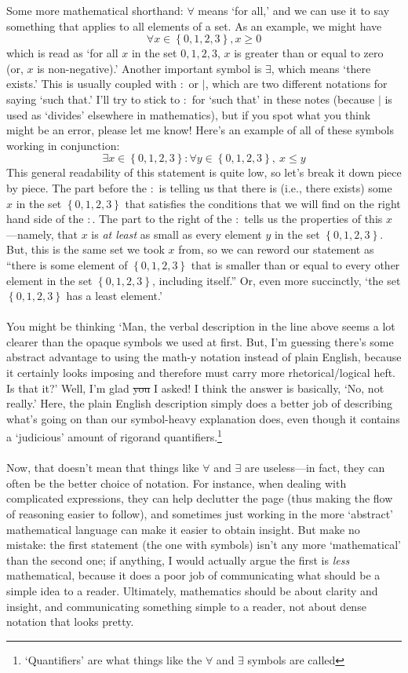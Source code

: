 \documentclass[10pt]{article}
\theoremstyle{definition}
\newcommand{\set}[1]{\left\{ #1 \right\}}
\begin{document}
Some more mathematical shorthand: $\forall$ means `for all,' and we can use it to say something that applies to all elements of a set.  As an example, we might have
\[\forall x\in \set{0,1,2,3}, x\geq 0\]
which is read as `for all $x$ in the set ${0,1,2,3}$, $x$ is greater than or equal to zero (or, $x$ is non-negative).'  Another important symbol is $\exists$, which means `there exists.'  This is usually coupled with $:$ or $|$, which are two different notations for saying `such that.'  I'll try to stick to $:$ for `such that' in these notes (because $|$ is used as `divides' elsewhere in mathematics), but if you spot what you think might be an error, please let me know!  Here's an example of all of these symbols working in conjunction:
\[\exists x\in \set{0,1,2,3} : \forall y\in\set{0,1,2,3},~x\leq y\]
This general readability of this statement is quite low, so let's break it down piece by piece.  The part before the $:$ is telling us that there is (i.e., there exists) some $x$ in the set $\set{0,1,2,3}$ that satisfies the conditions that we will find on the right hand side of the $:$.  The part to the right of the $:$ tells us the properties of this $x$---namely, that $x$ is \emph{at least} as small as every element $y$ in the set $\set{0,1,2,3}$.  But, this is the same set we took $x$ from, so we can reword our statement as ``there is some element of $\set{0,1,2,3}$ that is smaller than or equal to every other element in the set $\set{0,1,2,3}$, including itself.''  Or, even more succinctly, `the set $\set{0,1,2,3}$ has a least element.'  \\~\\
You might be thinking `Man, the verbal description in the line above seems a lot clearer than the opaque symbols we used at first.  But, I'm guessing there's some abstract advantage to using the math-y notation instead of plain English, because it certainly looks imposing and therefore must carry more rhetorical/logical heft.  Is that it?'  Well, I'm glad \sout{you} I asked!  I think the answer is basically, `No, not really.'  Here, the plain English description simply does a better job of describing what's going on than our symbol-heavy explanation does, even though it contains a `judicious' amount of rigor\texttrademark and quantifiers.\footnote{`Quantifiers' are what things like the $\forall$ and $\exists$ symbols are called}  \\~\\
Now, that doesn't mean that things like $\forall$ and $\exists$ are useless---in fact, they can often be the better choice of notation.  For instance, when dealing with complicated expressions, they can help declutter the page (thus making the flow of reasoning easier to follow), and sometimes just working in the more `abstract' mathematical language can make it easier to obtain insight.  But make no mistake: the first statement (the one with symbols) isn't any more `mathematical' than the second one; if anything, I would actually argue the first is \emph{less} mathematical, because it does a poor job of communicating what should be a simple idea to a reader.  Ultimately, mathematics should be about clarity and insight, and communicating something simple to a reader, not about dense notation that looks pretty.  
\end{document}
